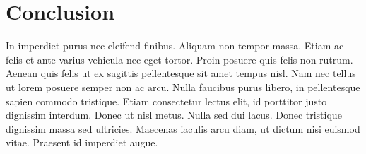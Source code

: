 

\section{Conclusion}
\label{sec:discussion_conclusion}

In imperdiet purus nec eleifend finibus. Aliquam non tempor massa. Etiam ac felis et ante varius vehicula nec eget tortor. Proin posuere quis felis non rutrum. Aenean quis felis ut ex sagittis pellentesque sit amet tempus nisl. Nam nec tellus ut lorem posuere semper non ac arcu. Nulla faucibus purus libero, in pellentesque sapien commodo tristique. Etiam consectetur lectus elit, id porttitor justo dignissim interdum. Donec ut nisl metus. Nulla sed dui lacus. Donec tristique dignissim massa sed ultricies. Maecenas iaculis arcu diam, ut dictum nisi euismod vitae. Praesent id imperdiet augue.

